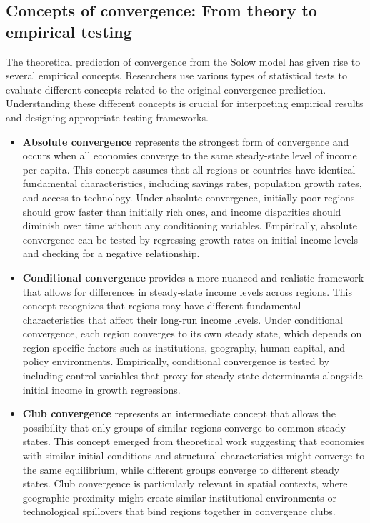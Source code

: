 \documentclass[smallextended, natbib]{svjour3}       %
\begin{document}
\subsection{Concepts of convergence: From theory to empirical testing}

The theoretical prediction of convergence from the Solow model has given rise to several empirical concepts. 
Researchers use various types of statistical tests to evaluate different concepts related to the original convergence prediction.
Understanding these different concepts is crucial for interpreting empirical results and designing appropriate testing frameworks.

\begin{itemize}
    \item \textbf{Absolute convergence} represents the strongest form of convergence and occurs when all economies converge to the same steady-state level of income per capita. This concept assumes that all regions or countries have identical fundamental characteristics, including savings rates, population growth rates, and access to technology. Under absolute convergence, initially poor regions should grow faster than initially rich ones, and income disparities should diminish over time without any conditioning variables. Empirically, absolute convergence can be tested by regressing growth rates on initial income levels and checking for a negative relationship.
    \item \textbf{Conditional convergence} provides a more nuanced and realistic framework that allows for differences in steady-state income levels across regions. This concept recognizes that regions may have different fundamental characteristics that affect their long-run income levels. Under conditional convergence, each region converges to its own steady state, which depends on region-specific factors such as institutions, geography, human capital, and policy environments. Empirically, conditional convergence is tested by including control variables that proxy for steady-state determinants alongside initial income in growth regressions.
    \item \textbf{Club convergence} represents an intermediate concept that allows the possibility that only groups of similar regions converge to common steady states. This concept emerged from theoretical work suggesting that economies with similar initial conditions and structural characteristics might converge to the same equilibrium, while different groups converge to different steady states. Club convergence is particularly relevant in spatial contexts, where geographic proximity might create similar institutional environments or technological spillovers that bind regions together in convergence clubs.    
\end{itemize}
\end{document}
